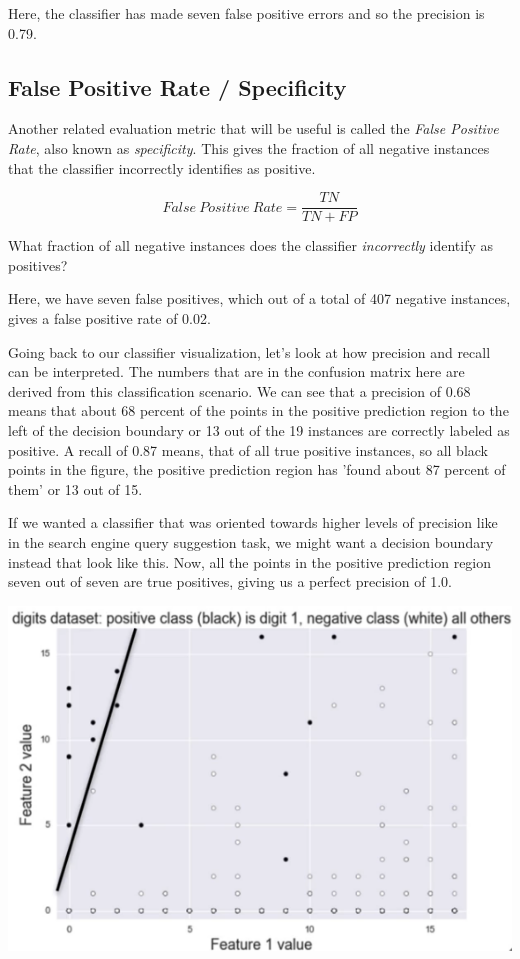 \begin{multicols}{2}
Here, the classifier has made seven false positive errors and so the precision is 0.79. 

\subsection{False Positive Rate / Specificity}

Another related evaluation metric that will be useful is called the \emph{False Positive Rate}, also known as \emph{specificity}. This gives the fraction of all negative instances that the classifier incorrectly identifies as positive. 

$$False\ Positive\ Rate = \frac{TN}{TN + FP}$$

What fraction of all negative instances does the classifier \emph{incorrectly} identify as positives?

Here, we have seven false positives, which out of a total of 407 negative instances, gives a false positive rate of 0.02. 

Going back to our classifier visualization, let's look at how precision and recall can be interpreted. The numbers that are in the confusion matrix here are derived from this classification scenario. We can see that a precision of 0.68 means that about 68 percent of the points in the positive prediction region to the left of the decision boundary or 13 out of the 19 instances are correctly labeled as positive. A recall of 0.87 means, that of all true positive instances, so all black points in the figure, the positive prediction region has 'found about 87 percent of them' or 13 out of 15. 

If we wanted a classifier that was oriented towards higher levels of precision like in the search engine query suggestion task, we might want a decision boundary instead that look like this. Now, all the points in the positive prediction region seven out of seven are true positives, giving us a perfect precision of 1.0. 

\begin{center}
\includegraphics[width=\linewidth]{img/High-Precision-Lower-Recall.png} 
\end{center}


\end{multicols}
